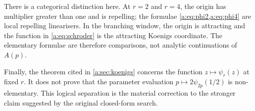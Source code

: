 There is a categorical distinction here.  At \(r=2\) and \(r=4\), the origin has
multiplier greater than one and is repelling; the formulae
\cref{a:eq:phi2,a:eq:phi4} are local repelling linearisers.  In the branching
window, the origin is attracting and the function in
\cref{a:eq:schroder} is the attracting Koenigs coordinate.  The elementary
formulae are therefore comparisons, not analytic continuations of \(A(p)\).

Finally, the theorem cited in \cref{a:sec:koenigs} concerns the function
\(z\mapsto\psi_r(z)\) at fixed \(r\).  It does not prove that the parameter
evaluation \(p\mapsto2\psi_{2p}(1/2)\) is non-elementary.  This logical separation
is the material correction to the stronger claim suggested by the original
closed-form search.

\FloatBarrier
